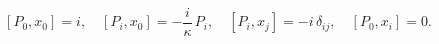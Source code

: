 \begin{equation}\label{26b}
  [P_0, x_0] = i, \quad [P_i, x_0] =  -\frac{i}\kappa\, P_i, \quad [P_i, x_j] =-
i\, \delta_{ij} , \quad [P_0, x_i] =0.
\end{equation}

